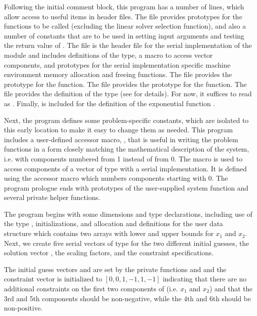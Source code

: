 Following the initial comment block, this program has a number
of  lines, which allow access to useful items in {\cvode}
header files. 
The  file provides prototypes for the {\kinsol}
functions to be called (excluding the linear solver selection
function), and also a number of constants that are to be used in
setting input arguments and testing the return value of .
The  file is the header file for the serial
implementation of the {\nvector} module and includes definitions of the 
 type, a macro to access vector components, and prototypes 
for the serial implementation specific machine environment memory allocation
and freeing functions.
The  file provides the prototype for the  function.
The  file provides the prototype for the  function.
The  file provides the definition of the
type  (see  for details).  
For now, it suffices to read  as .
Finally,  is included for the definition of the
exponential function .

Next, the program defines some problem-specific constants, which are
isolated to this early location to make it easy to change them as needed.  
This program includes a user-defined accessor macro, , that
is useful in writing the problem functions in a form closely matching 
the mathematical description of the system, i.e. with components numbered 
from 1 instead of from 0. The  macro is used to access components 
of a vector of type  with a serial implementation.  
It is defined using the {\nvecs} accessor macro  which 
numbers components starting with 0.
The program prologue ends with prototypes of the user-supplied system function 
 and several private helper functions.

The  program begins with some dimensions and type declarations,
including use of the type , initializations, and allocation
and definitions for the user data structure  which contains two
arrays with lower and upper bounds for $x_1$ and $x_2$. Next, we create five
serial vectors of type  for the two different initial guesses,
the solution vector , the scaling factors, and the constraint specifications.

The initial guess vectors  and  are set by the private
functions  and  and the constraint
vector  is initialized to $[0,0,1,-1,1,-1]$ indicating that there are
no additional constraints on the first two components of  (i.e. $x_1$ and 
$x_2$) and that the 3rd and 5th components should be non-negative, while
the 4th and 6th should be non-positive.

